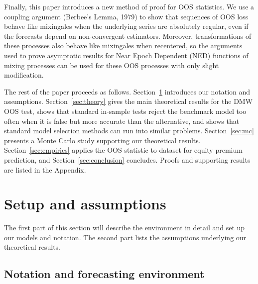\documentclass[12pt]{article}
\begin{document}
Finally, this paper introduces a new method of proof for OOS
statistics.  We use a coupling argument (Berbee's Lemma, 1979) to show
that sequences of OOS loss behave like mixingales when the
underlying series are absolutely regular, even if the forecasts depend
on non-convergent estimators.  Moreover, transformations of these
processes also behave like mixingales when recentered, so 
the arguments used to prove asymptotic
results for Near Epoch Dependent (NED) functions of mixing processes
can be used for these OOS processes with only slight modification.

The rest of the paper proceeds as follows.
Section~\ref{sec:assumptions} introduces our notation and assumptions.
Section~\ref{sec:theory} gives the main theoretical results for the
DMW OOS test, shows that standard in-sample tests reject the
benchmark model too often when it is false but more accurate than the
alternative, and shows that standard model selection methods can run
into similar problems. Section~\ref{sec:mc}
presents a Monte Carlo study supporting our theoretical results.
Section~\ref{sec:empirics} applies the OOS statistic to
 dataset for equity premium prediction, and
Section~\ref{sec:conclusion} concludes.  Proofs and supporting results
are listed in the Appendix.

\section{Setup and assumptions}
\label{sec:assumptions}

The first part of this section will describe the environment in detail
and set up our models and notation. The second part lists the
assumptions underlying our theoretical results.

\subsection{Notation and forecasting environment}
\end{document}
